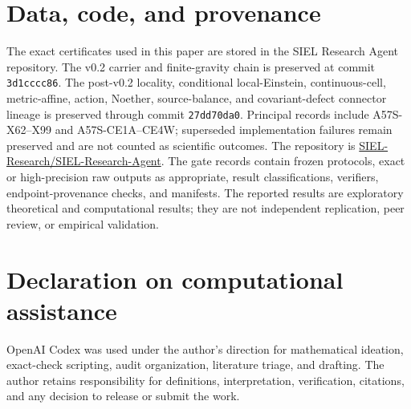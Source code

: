 \documentclass[11pt]{article}
\theoremstyle{definition}
\theoremstyle{remark}
\begin{document}
\section*{Data, code, and provenance}

The exact certificates used in this paper are stored in the SIEL Research Agent repository. The v0.2 carrier and finite-gravity chain is preserved at commit \texttt{3d1cccc86}. The post-v0.2 locality, conditional local-Einstein, continuous-cell, metric-affine, action, Noether, source-balance, and covariant-defect connector lineage is preserved through commit \texttt{27dd70da0}. Principal records include A57S-X62--X99 and A57S-CE1A--CE4W; superseded implementation failures remain preserved and are not counted as scientific outcomes. The repository is
\href{https://github.com/SIEL-Research/SIEL-Research-Agent}{SIEL-Research/SIEL-Research-Agent}.
The gate records contain frozen protocols, exact or high-precision raw outputs as appropriate, result classifications, verifiers, endpoint-provenance checks, and manifests. The reported results are exploratory theoretical and computational results; they are not independent replication, peer review, or empirical validation.

\section*{Declaration on computational assistance}

OpenAI Codex was used under the author's direction for mathematical ideation, exact-check scripting, audit organization, literature triage, and drafting. The author retains responsibility for definitions, interpretation, verification, citations, and any decision to release or submit the work.
\end{document}
